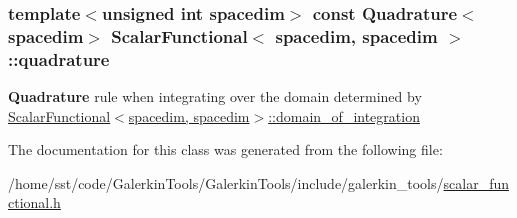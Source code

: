 \subsubsection[{\texorpdfstring{quadrature}{quadrature}}]{\setlength{\rightskip}{0pt plus 5cm}template$<$unsigned int spacedim$>$ const {\bf Quadrature}$<$spacedim$>$ {\bf Scalar\+Functional}$<$ spacedim, spacedim $>$\+::quadrature}\hypertarget{class_scalar_functional_3_01spacedim_00_01spacedim_01_4_ab83ee3ae077b211137824b006098382e}{}\label{class_scalar_functional_3_01spacedim_00_01spacedim_01_4_ab83ee3ae077b211137824b006098382e}
{\bf Quadrature} rule when integrating over the domain determined by \hyperlink{class_scalar_functional_3_01spacedim_00_01spacedim_01_4_aa192395f822a64f60df43bf9d36c2f3a}{Scalar\+Functional$<$spacedim, spacedim$>$\+::domain\+\_\+of\+\_\+integration} 

The documentation for this class was generated from the following file\+:\begin{DoxyCompactItemize}
\item 
/home/sst/code/\+Galerkin\+Tools/\+Galerkin\+Tools/include/galerkin\+\_\+tools/\hyperlink{scalar__functional_8h}{scalar\+\_\+functional.\+h}\end{DoxyCompactItemize}
